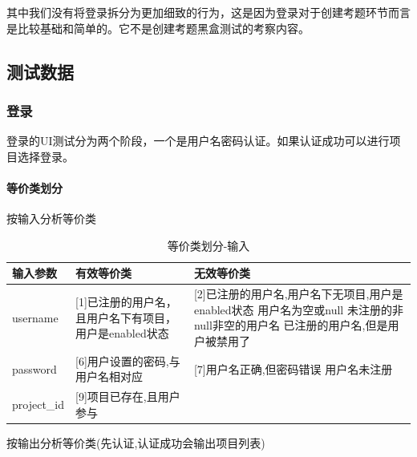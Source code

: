 \documentclass[hyperref, a4paper]{ctexart}
\let\oldparagraph\paragraph
\renewcommand{\paragraph}[1]{\oldparagraph{#1}\mbox{}}
\begin{document}
其中我们没有将登录拆分为更加细致的行为，这是因为登录对于创建考题环节而言是比较基础和简单的。它不是创建考题黑盒测试的考察内容。

\hypertarget{ux6d4bux8bd5ux6570ux636e}{%
\subsection{测试数据}\label{ux6d4bux8bd5ux6570ux636e}}

\hypertarget{ux767bux5f55-1}{%
\subsubsection{登录}\label{ux767bux5f55-1}}

登录的UI测试分为两个阶段，一个是用户名密码认证。如果认证成功可以进行项目选择登录。

\hypertarget{ux7b49ux4ef7ux7c7bux5212ux5206}{%
\paragraph{等价类划分}\label{ux7b49ux4ef7ux7c7bux5212ux5206}}

按输入分析等价类

\begin{table}[!htbp]
  \caption{等价类划分-输入}
  \label{Tab:bookRWCal}
  \centering
  \begin{tabular}{|p{2.0cm}|p{4.5cm}|p{6.5cm}|}
  \hline
  \textbf{输入参数} &\textbf{有效等价类} &\textbf{无效等价类} \\
  \hline
  username    & [1]已注册的用户名，且用户名下有项目，用户是enabled状态 &  [2]已注册的用户名,用户名下无项目,用户是enabled状态 \newline[3]用户名为空或null   \newline[4]未注册的非null非空的用户名  \newline[5]已注册的用户名,但是用户被禁用了 \\
  \hline
 password    & [6]用户设置的密码,与用户名相对应               & [7]用户名正确,但密码错误    \newline[8]用户名未注册    \\
  \hline
 project\_id    &  [9]项目已存在,且用户参与                    & ~                                                                                          \\
  \hline
  \end{tabular}
\end{table}

按输出分析等价类(先认证,认证成功会输出项目列表)
\end{document}
